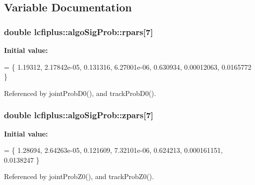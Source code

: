 \subsection{Variable Documentation}
\subsubsection[{rpars}]{\setlength{\rightskip}{0pt plus 5cm}double lcfiplus\-::algo\-Sig\-Prob\-::rpars[7]}\label{namespacelcfiplus_1_1algoSigProb_a326ec0f0497c4389a6a40ee5a7e7b85f}
{\bfseries Initial value\-:}
\begin{DoxyCode}
= \{
  1.19312,
  2.17842e-05,
  0.131316,
  6.27001e-06,
  0.630934,
  0.00012063,
  0.0165772
\}
\end{DoxyCode}


Referenced by joint\-Prob\-D0(), and track\-Prob\-D0().

\subsubsection[{zpars}]{\setlength{\rightskip}{0pt plus 5cm}double lcfiplus\-::algo\-Sig\-Prob\-::zpars[7]}\label{namespacelcfiplus_1_1algoSigProb_a16dd326bd0db6084e4aace741538642e}
{\bfseries Initial value\-:}
\begin{DoxyCode}
= \{
  1.28694,
  2.64263e-05,
  0.121609,
  7.32101e-06,
  0.624213,
  0.000161151,
  0.0138247
\}
\end{DoxyCode}


Referenced by joint\-Prob\-Z0(), and track\-Prob\-Z0().


